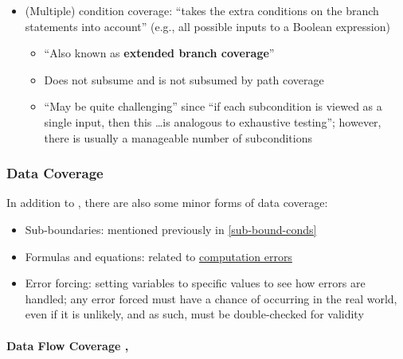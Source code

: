 \begin{itemize}
      \item (Multiple) condition coverage: ``takes the extra conditions on the
            branch statements into account'' (e.g., all possible inputs to a
            Boolean expression) \cite[p.~120]{patton_software_2006}
            \begin{itemize}
                  \item ``Also known as \textbf{extended branch coverage}''
                        \cite[p.~422]{van_vliet_software_2000}
                  \item Does not subsume and is not subsumed by path coverage
                        \cite[p.~433]{van_vliet_software_2000}
                  \item ``May be quite challenging'' since ``if each
                        subcondition is viewed as a single input, then this
                        \dots is analogous to exhaustive testing''; however,
                        there is usually a manageable number of subconditions
                        \cite[p.~464]{peters_software_2000}
            \end{itemize}
\end{itemize}

\subsubsection{Data Coverage \cite[p.~114-116]{patton_software_2006}}

In addition to , there are also some minor forms of
data coverage:

\begin{itemize}
      \item Sub-boundaries: mentioned previously in \ref{sub-bound-conds}
      \item Formulas and equations: related to
            \hyperref[comp-errors]{computation errors}
      \item Error forcing: setting variables to specific values to see how
            errors are handled; any error forced must have a chance of
            occurring in the real world, even if it is unlikely, and as such,
            must be double-checked for validity
            \cite[p.~116]{patton_software_2006}
\end{itemize}

\paragraph{Data Flow Coverage \cite[p.~114]{patton_software_2006},
      \cite[pp.~424-425]{van_vliet_software_2000}}
\label{data-flow-coverage}

